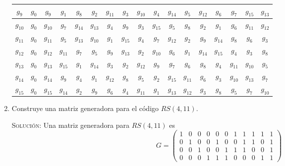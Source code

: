 \documentclass[letterpaper,11pt]{article}
\begin{document}
\begin{enumerate}
\begin{table}[h]
\begin{center}
\begin{tabular}{|c|c|c|c|c|c|c|c|c|c|c|c|c|c|c|c|c|}
    $g_{9}$ & $g_{0}$ & $g_{9}$ & $g_{1}$ & $g_{8}$ & $g_{2}$ & $g_{11}$ & 
    $g_{3}$ & $g_{10}$ & $g_{4}$ & $g_{14}$ & $g_{5}$ & $g_{12}$ & $g_{6}$ & 
    $g_{7}$ & $g_{15}$ & $g_{13}$ \\ \hline
    $g_{10}$ & $g_{0}$ & $g_{10}$ & $g_{7}$ & $g_{14}$ & $g_{13}$ & $g_{4}$ & 
    $g_{9}$ & $g_{3}$ & $g_{15}$ & $g_{5}$ & $g_{8}$ & $g_{2}$ & $g_{1}$ & 
    $g_{6}$ & $g_{11}$ & $g_{12}$ \\ \hline
    $g_{11}$ & $g_{0}$ & $g_{11}$ & $g_{5}$ & $g_{13}$ & $g_{10}$ & $g_{1}$ & 
    $g_{15}$ & $g_{4}$ & $g_{7}$ & $g_{12}$ & $g_{2}$ & $g_{9}$ & $g_{14}$ &
    $g_{8}$ & $g_{6}$ & $g_{3}$ \\ \hline
    $g_{12}$ & $g_{0}$ & $g_{12}$ & $g_{11}$ & $g_{7}$ & $g_{5}$ & $g_{9}$ & 
    $g_{13}$ & $g_{2}$ & $g_{10}$ & $g_{6}$ & $g_{1}$ & $g_{14}$ & $g_{15}$ & 
    $g_{4}$ & $g_{3}$ & $g_{8}$ \\ \hline
    $g_{13}$ & $g_{0}$ & $g_{13}$ & $g_{15}$ & $g_{1}$ & $g_{14}$ & $g_{3}$ & 
    $g_{2}$ & $g_{12}$ & $g_{9}$ & $g_{7}$ & $g_{6}$ & $g_{8}$ & $g_{4}$ & 
    $g_{11}$ & $g_{10}$ & $g_{5}$ \\ \hline
    $g_{14}$ & $g_{0}$ & $g_{14}$ & $g_{9}$ & $g_{4}$ & $g_{1}$ & $g_{12}$ & 
    $g_{8}$ & $g_{5}$ & $g_{2}$ & $g_{15}$ & $g_{11}$ & $g_{6}$ & $g_{3}$ & 
    $g_{10}$ & $g_{13}$ & $g_{7}$  \\ \hline
    $g_{15}$ & $g_{0}$ & $g_{15}$ & $g_{14}$ & $g_{2}$ & $g_{9}$ & $g_{6}$ & 
    $g_{4}$ & $g_{11}$ & $g_{1}$ & $g_{13}$ & $g_{12}$ & $g_{3}$ & $g_{8}$ & 
    $g_{5}$ & $g_{7}$ & $g_{10}$  \\ \hline
    \end{tabular}
    \end{center}
    \end{table}
    
    \item Construye una matriz generadora para el código $RS(4,11)$. 
    
    \textsc{Solución:} Una matriz generadora para $RS(4, 11)$ es 
    \begin{equation*}
        G = 
        \begin{pmatrix}
        1 & 0 & 0 & 0 & 0 & 0 & 1 & 1 & 1 & 1 & 1\\
        0 & 1 & 0 & 0 & 1 & 0 & 0 & 1 & 1 & 0 & 1\\
        0 & 0 & 1 & 0 & 0 & 1 & 1 & 1 & 0 & 0 & 1\\
        0 & 0 & 0 & 1 & 1 & 1 & 0 & 0 & 0 & 1 & 1
        \end{pmatrix}
    \end{equation*}
    

\end{enumerate}
\end{document}
